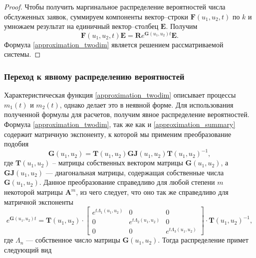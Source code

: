 \begin{proof}
	Чтобы получить маргинальное распределение вероятностей числа обслуженных заявок, суммируем компоненты вектор--строки $\boldsymbol{F}(u_{1},u_{2},t)$ по $k$ и умножаем результат на единичный вектор--столбец $\boldsymbol{E}$. Получим
	\begin{equation}\label{approximation_twodim}
		\boldsymbol{F}(u_{1},u_{2},t)\boldsymbol{E}=\boldsymbol{R}e^{\boldsymbol{G}(u_{1},u_{2})t}\boldsymbol{E}.
	\end{equation}
	Формула \eqref{approximation_twodim} является решением рассматриваемой системы. 
\end{proof}

\subsubsection{Переход к явному распределению вероятностей} \label{distr_find_twodim}
Характеристическая функция \eqref{approximation_twodim} описывает процессы $m_{1}(t)$ и $m_{2}(t)$, однако делает это в неявной форме. Для использования полученной формулы для расчетов, получим явное распределение вероятностей.
Формула \eqref{approximation_twodim}, так же как и \eqref{approximation_summary} содержит матричную экспоненту, к которой мы применим преобразование подобия \cite{bronson1991matrix}
\begin{equation*}
	\boldsymbol{G}(u_{1},u_{2}) =\boldsymbol{T}(u_{1},u_{2})\boldsymbol{GJ}(u_{1},u_{2})\boldsymbol{T}(u_{1},u_{2})^{-1},
\end{equation*}
где $\boldsymbol{T}(u_{1},u_{2})$ – матрицы собственных вектором матрицы $\boldsymbol{G}(u_{1},u_{2})$, а $\boldsymbol{GJ}(u_{1},u_{2})$ --- диагональная матрицы, содержащая собственные числа $\boldsymbol{G}(u_{1},u_{2})$. Данное преобразование справедливо для любой степени $m$ некоторой матрицы $\boldsymbol{A}^{m}$, из чего следует, что оно так же справедливо для матричной экспоненты \cite{egorov2006prog}
\begin{equation*}
	e^{\boldsymbol{G}(u_{1},u_{2})t}=\boldsymbol{T}(u_{1},u_{2})\cdot \begin{bmatrix}
		e^{t \Lambda_{1}(u_{1},u_{2})} & 0 &  0\\
		0 & e^{t \Lambda_{2}(u_{1},u_{2})} & 0\\
		0 & 0 &	e^{t \Lambda_{3}(u_{1},u_{2})}
	\end{bmatrix} \cdot \boldsymbol{T}(u_{1},u_{2})^{-1},
\end{equation*}
где $\Lambda_{n}$ --- собственное число матрицы $\boldsymbol{G}(u_{1},u_{2})$. Тогда распределение примет следующий вид
